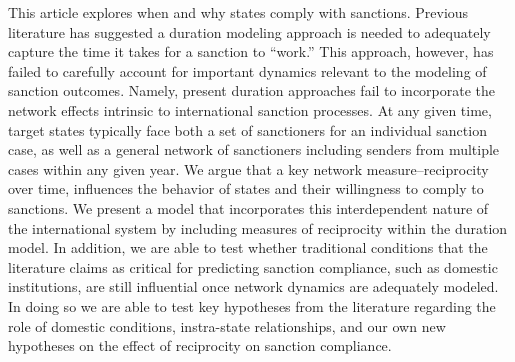 This article explores when and why states comply with sanctions. Previous literature has suggested a duration modeling approach is needed to adequately capture the time it takes for a sanction to ``work.'' This approach, however, has failed to carefully account for important dynamics relevant to the modeling of sanction outcomes. Namely, present duration approaches fail to incorporate the network effects intrinsic to international sanction processes. At any given time, target states typically face both a set of sanctioners for an individual sanction case, as well as a general network of sanctioners including senders from multiple cases within any given year. We argue that a key network measure--reciprocity over time, influences the behavior of states and their willingness to comply to sanctions. We present a model that incorporates this interdependent nature of the international system by including measures of reciprocity within the duration model. In addition, we are able to test whether traditional conditions that the literature claims as critical for predicting sanction compliance, such as domestic institutions, are still influential once network dynamics are adequately modeled. In doing so we are able to test key hypotheses from the literature regarding the role of domestic conditions, instra-state relationships, and our own new hypotheses on the effect of reciprocity on sanction compliance. 